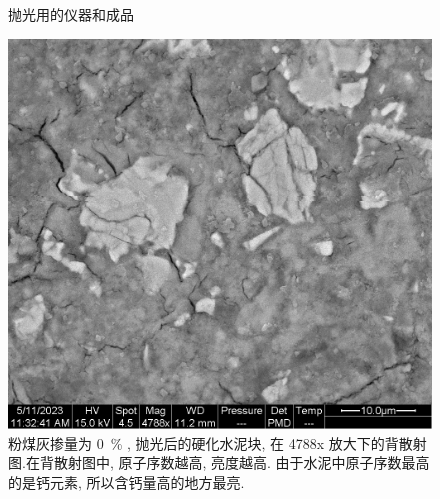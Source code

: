 \begin{figure}[!t]
  \centering
   \quad
  \caption{抛光用的仪器和成品}
\end{figure}

\begin{figure}
  \centering
  \includegraphics[width = 0.4 \linewidth]{assets/00-polished-04788x-PMD.png}
  \caption{粉煤灰掺量为 \SI{0}{\percent} , 抛光后的硬化水泥块, 在 4788x 放大下的背散射图.在背散射图中, 原子序数越高, 亮度越高. 由于水泥中原子序数最高的是钙元素, 所以含钙量高的地方最亮. }
\end{figure}


